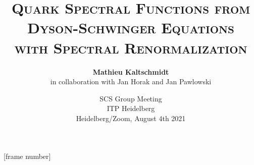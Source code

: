 \title{\LARGE\textsc{Quark Spectral Functions from Dyson-Schwinger Equations\\ with Spectral Renormalization}}

\author{\textbf{\large Mathieu Kaltschmidt} \\[0.5em] in collaboration with Jan Horak and Jan Pawlowski}
\date{SCS Group Meeting\\ ITP Heidelberg\\[1em]
Heidelberg/Zoom, August 4th 2021}




\beamertemplatenavigationsymbolsempty
{}




\usepackage{fontspec}


[frame number]{}

\usepackage{amsmath,amssymb,nccmath}
\usepackage{commath}
\usepackage{mathtools}
\usepackage{physics, slashed} %
\usepackage{xfrac, relsize, bbm, chngcntr} %
\usepackage[export]{adjustbox}
\usepackage{bbold, todonotes}

\usepackage{polyglossia}
\setmainlanguage{english}


\usepackage{appendixnumberbeamer}
\usepackage{booktabs}
\usepackage{siunitx}
\usepackage{graphicx}
\usepackage{float}
\usepackage{blindtext}
\usepackage{physics}
\usepackage[labelfont=bf]{caption}
\usepackage{todonotes}
\usepackage{subfigure}

\usepackage{xcolor}

